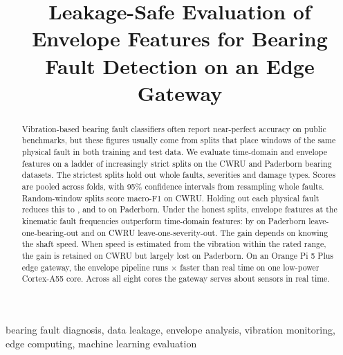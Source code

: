 \documentclass[conference,letterpaper]{IEEEtran}
\newcommand{\todo}[1]{\textcolor{red}{[#1]}}
\begin{document}
\title{Leakage-Safe Evaluation of Envelope Features for Bearing Fault Detection on an Edge Gateway}

\author{
\IEEEauthorblockA{\textit{\todo{Department}} \\
\textit{\todo{Institution}}\\
\todo{City, Postcode, Country} \\
shandilya.akshaj@gmail.com}
}

\maketitle

\begin{abstract}
Vibration-based bearing fault classifiers often report near-perfect accuracy on public benchmarks, but these
figures usually come from splits that place windows of the same physical fault in both training and test data.
We evaluate time-domain and envelope features on a ladder of increasingly strict splits on the CWRU and
Paderborn bearing datasets. The strictest splits hold out whole faults, severities and damage types. Scores
are pooled across folds, with 95\% confidence intervals from resampling whole faults. Random-window splits score
 macro-F1 on CWRU. Holding out each physical fault reduces this to
, and to  on Paderborn. Under the honest splits,
envelope features at the kinematic fault frequencies outperform time-domain features: by
 on Paderborn leave-one-bearing-out and  on CWRU
leave-one-severity-out. The gain depends on knowing the shaft speed. When speed is estimated from the vibration
within the rated range, the gain is retained on CWRU but largely lost on Paderborn. On an Orange Pi 5 Plus edge
gateway, the envelope pipeline runs $\times$ faster than real time on one low-power
Cortex-A55 core. Across all eight cores the gateway serves about  sensors in real time.
\end{abstract}

\begin{IEEEkeywords}
bearing fault diagnosis, data leakage, envelope analysis, vibration monitoring, edge computing, machine learning evaluation
\end{IEEEkeywords}
\end{document}
